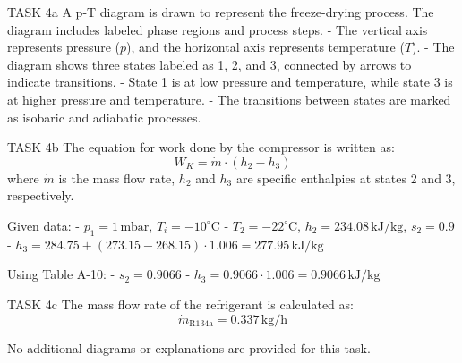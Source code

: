 TASK 4a  
A p-T diagram is drawn to represent the freeze-drying process. The diagram includes labeled phase regions and process steps.  
- The vertical axis represents pressure (\( p \)), and the horizontal axis represents temperature (\( T \)).  
- The diagram shows three states labeled as 1, 2, and 3, connected by arrows to indicate transitions.  
- State 1 is at low pressure and temperature, while state 3 is at higher pressure and temperature.  
- The transitions between states are marked as isobaric and adiabatic processes.  

TASK 4b  
The equation for work done by the compressor is written as:  
\[
W_K = \dot{m} \cdot (h_2 - h_3)
\]  
where \( \dot{m} \) is the mass flow rate, \( h_2 \) and \( h_3 \) are specific enthalpies at states 2 and 3, respectively.  

Given data:  
- \( p_1 = 1 \, \text{mbar} \), \( T_i = -10^\circ\text{C} \)  
- \( T_2 = -22^\circ\text{C} \), \( h_2 = 234.08 \, \text{kJ/kg} \), \( s_2 = 0.9 \)  
- \( h_3 = 284.75 + (273.15 - 268.15) \cdot 1.006 = 277.95 \, \text{kJ/kg} \)  

Using Table A-10:  
- \( s_2 = 0.9066 \)  
- \( h_3 = 0.9066 \cdot 1.006 = 0.9066 \, \text{kJ/kg} \)  

TASK 4c  
The mass flow rate of the refrigerant is calculated as:  
\[
\dot{m}_{\text{R134a}} = 0.337 \, \text{kg/h}
\]  

No additional diagrams or explanations are provided for this task.